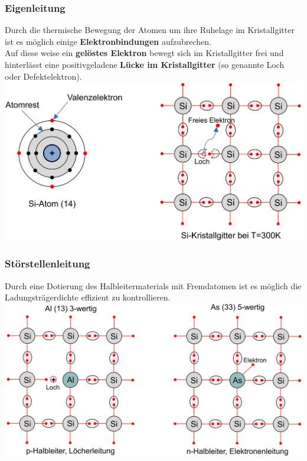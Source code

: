 \subsubsection{Eigenleitung}
Durch die thermische Bewegung der Atomen um ihre Ruhelage im Kristallgitter ist es möglich 
einige \textbf{Elektronbindungen} aufzubrechen.\\ 
Auf diese weise ein \textbf{gelöstes Elektron} bewegt sich im Kristallgitter 
frei und hinterlässt eine positivgeladene \textbf{Lücke im Kristallgitter} (so genannte Loch oder Defektelektron).
\includegraphics[width=\columnwidth]{images/Bild3.png}

\subsubsection{Störstellenleitung}
Durch eine Dotierung des Halbleitermaterials mit Fremdatomen ist es möglich 
die Ladungsträgerdichte effizient zu kontrollieren.\\
\includegraphics[width=\columnwidth]{images/Bild4.png}

